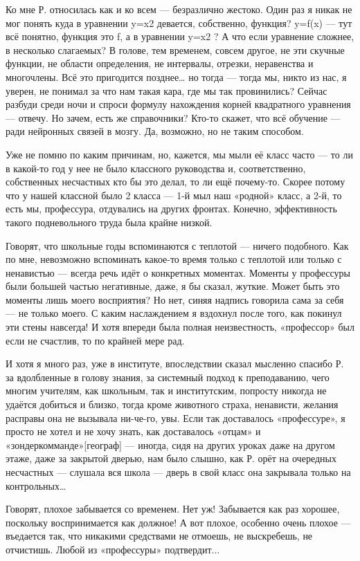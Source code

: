 Ко мне Р. относилась как и ко всем — безразлично жестоко. Один раз я никак не мог понять куда в уравнении y=x2 девается, собственно, функция? y=f(x) — тут всё понятно, функция это f, а в уравнении y=x2 ? А что если уравнение сложнее, в несколько слагаемых? В голове, тем временем, совсем другое, не эти скучные функции, не области определения, не интервалы, отрезки, неравенства и многочлены. Всё это пригодится позднее… но тогда — тогда мы, никто из нас, я уверен, не понимал за что нам такая кара, где мы так провинились? Сейчас разбуди среди ночи и спроси формулу нахождения корней квадратного уравнения — отвечу. Но зачем, есть же справочники? Кто-то скажет, что всё обучение — ради нейронных связей в мозгу. Да, возможно, но не таким способом. 

Уже не помню по каким причинам, но, кажется, мы мыли её класс часто — то ли в какой-то год у нее не было классного руководства и, соответственно, собственных несчастных кто бы это делал, то ли ещё почему-то. Скорее потому что у нашей классной было 2 класса — 1-й мыл наш «родной» класс, а 2-й, то есть мы, профессура, отдувались на других фронтах. Конечно, эффективность такого подневольного труда была крайне низкой. 

Говорят, что школьные годы вспоминаются с теплотой — ничего подобного. Как по мне, невозможно вспоминать какое-то время только с теплотой или только с ненавистью — всегда речь идёт о конкретных моментах. Моменты у профессуры были большей частью негативные, даже, я бы сказал, жуткие. Может быть это моменты лишь моего восприятия? Но нет, синяя надпись говорила сама за себя — не только моего. С каким наслаждением я вздохнул после того, как покинул эти стены навсегда! И хотя впереди была полная неизвестность, «профессор» был если не счастлив, то по крайней мере рад. 

И хотя я много раз, уже в институте, впоследствии сказал мысленно спасибо Р. за вдолбленные в голову знания, за системный подход к преподаванию, чего многим учителям, как школьным, так и институтским, попросту никогда не удаётся добиться и близко, тогда кроме животного страха, ненависти, желания расправы она не вызывала ни-че-го, увы. Если так доставалось «профессуре», я просто не хотел и не хочу знать, как доставалось «отцам» и «зондеркомманде»[географ] — иногда, сидя на других уроках даже на другом этаже, даже за закрытой дверью, нам было слышно, как Р. орёт на очередных несчастных — слушала вся школа — дверь в свой класс она закрывала только на контрольных… 

Говорят, плохое забывается со временем. Нет уж! Забывается как раз хорошее, поскольку воспринимается как должное! А вот плохое, особенно очень плохое — въедается так, что никакими средствами не отмоешь, не выскребешь, не отчистишь. Любой из «профессуры» подтвердит...